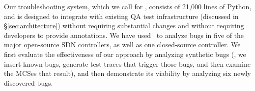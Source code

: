 Our troubleshooting system, which we call {\projectname} for \projectmeaning,
consists of 21,000 lines of Python, and is designed to
integrate with existing QA test infrastructure (discussed in
\S\ref{sec:architecture}) without requiring substantial
changes and without requiring developers to provide annotations.
We have used \projectname~to analyze bugs in \num{five} of the major open-source SDN
controllers, as well as one closed-source controller. We first evaluate
the effectiveness of our approach by analyzing synthetic bugs (\ie, we insert known
bugs, generate test traces that trigger those bugs, and then examine the MCSes that
result), and then demonstrate its viability by analyzing \num{six} newly discovered bugs.
